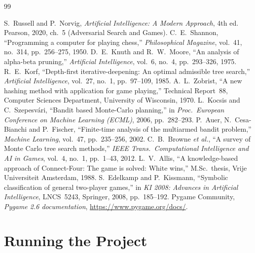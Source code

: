 \documentclass[11pt,a4paper]{article}
\begin{document}
\begin{thebibliography}{99}
\small
{} S.~Russell and P.~Norvig, \emph{Artificial Intelligence: A Modern Approach}, 4th ed. Pearson, 2020, ch.~5 (Adversarial Search and Games).
 C.~E.~Shannon, ``Programming a computer for playing chess,'' \emph{Philosophical Magazine}, vol.~41, no.~314, pp.~256--275, 1950.
 D.~E.~Knuth and R.~W.~Moore, ``An analysis of alpha-beta pruning,'' \emph{Artificial Intelligence}, vol.~6, no.~4, pp.~293--326, 1975.
 R.~E.~Korf, ``Depth-first iterative-deepening: An optimal admissible tree search,'' \emph{Artificial Intelligence}, vol.~27, no.~1, pp.~97--109, 1985.
 A.~L.~Zobrist, ``A new hashing method with application for game playing,'' Technical Report~88, Computer Sciences Department, University of Wisconsin, 1970.
 L.~Kocsis and C.~Szepesv\'ari, ``Bandit based Monte-Carlo planning,'' in \emph{Proc.\ European Conference on Machine Learning (ECML)}, 2006, pp.~282--293.
 P.~Auer, N.~Cesa-Bianchi and P.~Fischer, ``Finite-time analysis of the multiarmed bandit problem,'' \emph{Machine Learning}, vol.~47, pp.~235--256, 2002.
 C.~B.~Browne \emph{et al.}, ``A survey of Monte Carlo tree search methods,'' \emph{IEEE Trans.\ Computational Intelligence and AI in Games}, vol.~4, no.~1, pp.~1--43, 2012.
 L.~V.~Allis, ``A knowledge-based approach of Connect-Four: The game is solved: White wins,'' M.Sc.\ thesis, Vrije Universiteit Amsterdam, 1988.
 S.~Edelkamp and P.~Kissmann, ``Symbolic classification of general two-player games,'' in \emph{KI 2008: Advances in Artificial Intelligence}, LNCS~5243, Springer, 2008, pp.~185--192.
 Pygame Community, \emph{Pygame 2.6 documentation}, \url{https://www.pygame.org/docs/}.
\end{thebibliography}

\appendix
\section{Running the Project}\label{app:run}
\end{document}
